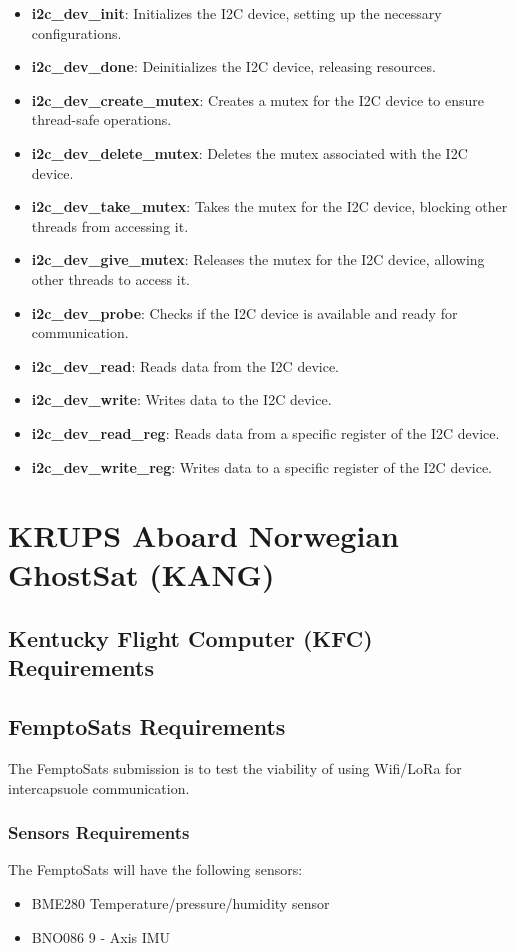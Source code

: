 \documentclass{book}
\begin{document}
\begin{itemize}
    \item \textbf{i2c\_dev\_init}: Initializes the I2C device, setting up the necessary configurations.
    \item \textbf{i2c\_dev\_done}: Deinitializes the I2C device, releasing resources.
    \item \textbf{i2c\_dev\_create\_mutex}: Creates a mutex for the I2C device to ensure thread-safe operations.
    \item \textbf{i2c\_dev\_delete\_mutex}: Deletes the mutex associated with the I2C device.
    \item \textbf{i2c\_dev\_take\_mutex}: Takes the mutex for the I2C device, blocking other threads from accessing it.
    \item \textbf{i2c\_dev\_give\_mutex}: Releases the mutex for the I2C device, allowing other threads to access it.
    \item \textbf{i2c\_dev\_probe}: Checks if the I2C device is available and ready for communication.
    \item \textbf{i2c\_dev\_read}: Reads data from the I2C device.
    \item \textbf{i2c\_dev\_write}: Writes data to the I2C device.
    \item \textbf{i2c\_dev\_read\_reg}: Reads data from a specific register of the I2C device.
    \item \textbf{i2c\_dev\_write\_reg}: Writes data to a specific register of the I2C device.
\end{itemize}
\chapter{KRUPS Aboard Norwegian GhostSat (KANG)}
\section{Kentucky Flight Computer (KFC) Requirements}

\section{FemptoSats Requirements}
\par The FemptoSats submission is to test the viability of using Wifi/LoRa for intercapsuole communication. 

\subsection{Sensors Requirements}
\par The FemptoSats will have the following sensors: 
\begin{itemize}
    \item BME280 Temperature/pressure/humidity sensor
    \item BNO086 9 - Axis IMU
\end{itemize}
\end{document}
